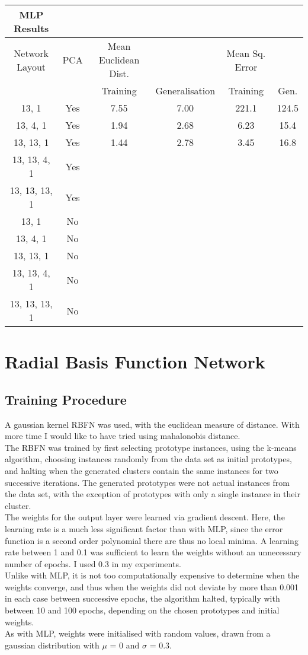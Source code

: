 \documentclass{article}
\begin{document}
\begin{tabular}{c | c | c | c | c | c}
    MLP Results & & & & & \\
    \hline
    Network Layout & PCA & Mean Euclidean Dist. & & Mean Sq. Error & \\
    \hline
    & & Training & Generalisation & Training & Gen. \\
    \hline
    13, 1         & Yes & 7.55 & 7.00 & 221.1 & 124.5 \\
    13, 4, 1      & Yes & 1.94 & 2.68 & 6.23 & 15.4 \\
    13, 13, 1     & Yes & 1.44 & 2.78 & 3.45 & 16.8 \\
    13, 13, 4, 1  & Yes &  &  &  &  \\
    13, 13, 13, 1 & Yes &  &  &  &  \\
    13, 1         & No  &  &  &  &  \\
    13, 4, 1      & No  &  &  &  &  \\
    13, 13, 1     & No  &  &  &  &  \\
    13, 13, 4, 1  & No  &  &  &  &  \\
    13, 13, 13, 1 & No  &  &  &  &  \\
\end{tabular}

\section*{Radial Basis Function Network}
\subsection*{Training Procedure}
\noindent A gaussian kernel RBFN was used, with the euclidean measure of distance. With more time I would like to have tried using mahalonobis distance. \\
\indent The RBFN was trained by first selecting prototype instances, using the k-means algorithm, choosing instances randomly from the data set as initial prototypes, and halting when the generated clusters contain the same instances for two successive iterations. The generated prototypes were not actual instances from the data set, with the exception of prototypes with only a single instance in their cluster. \\
\indent The weights for the output layer were learned via gradient descent. Here, the learning rate is a much less significant factor than with MLP, since the error function is a second order polynomial there are thus no local minima. A learning rate between 1 and 0.1 was sufficient to learn the weights without an unnecessary number of epochs. I used 0.3 in my experiments. \\
\indent Unlike with MLP, it is not too computationally expensive to determine when the weights converge, and thus when the weights did not deviate by more than 0.001 in each case between successive epochs, the algorithm halted, typically with between 10 and 100 epochs, depending on the chosen prototypes and initial weights. \\
\indent As with MLP, weights were initialised with random values, drawn from a gaussian distribution with $\mu$ = 0 and $\sigma$ = 0.3. \\
\end{document}
